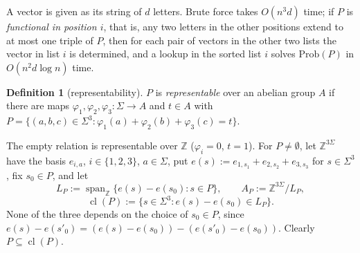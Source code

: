 \documentclass[11pt]{article}
\theoremstyle{definition}
\newtheorem{definition}[theorem]{Definition}
\theoremstyle{remark}
\newcommand{\Z}{\mathbb{Z}}
\newcommand{\Prob}{\mathrm{Prob}}
\DeclareMathOperator{\cl}{cl}
\begin{document}
A vector is given as its string of $d$ letters. Brute force takes $O(n^3d)$ time; if $P$ is \emph{functional in position $i$}, that is, any two letters in the other positions extend to at most one triple of $P$, then for each pair of vectors in the other two lists the vector in list $i$ is determined, and a lookup in the sorted list $i$ solves $\Prob(P)$ in $O(n^2d\log n)$ time.

\begin{definition}[representability]\label{g:def:rep}
$P$ is \emph{representable} over an abelian group $A$ if there are maps $\varphi_1,\varphi_2,\varphi_3\colon\Sigma\to A$ and $t\in A$ with $P=\{(a,b,c)\in\Sigma^3:\varphi_1(a)+\varphi_2(b)+\varphi_3(c)=t\}$.
\end{definition}

The empty relation is representable over $\Z$ ($\varphi_i=0$, $t=1$). For $P\ne\emptyset$, let $\Z^{3\Sigma}$ have the basis $e_{i,a}$, $i\in\{1,2,3\}$, $a\in\Sigma$, put $e(s):=e_{1,s_1}+e_{2,s_2}+e_{3,s_3}$ for $s\in\Sigma^3$, fix $s_0\in P$, and let
\[
L_P:=\operatorname{span}_\Z\{e(s)-e(s_0):s\in P\},\qquad A_P:=\Z^{3\Sigma}/L_P,
\]
\[
\cl(P):=\{s\in\Sigma^3:e(s)-e(s_0)\in L_P\}.
\]
None of the three depends on the choice of $s_0\in P$, since $e(s)-e(s'_0)=(e(s)-e(s_0))-(e(s'_0)-e(s_0))$. Clearly $P\subseteq\cl(P)$.
\end{document}
